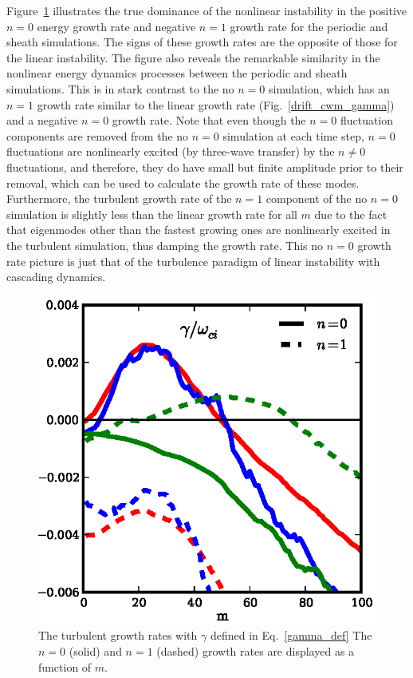 \documentclass[showpacs,preprintnumbers,amsmath,amssymb,superscriptaddress,aip]{revtex4-1}
\begin{document}
Figure~\ref{nl_vs_lin_gamma} illustrates the true dominance of the nonlinear instability in the positive $n=0$ energy growth rate and negative $n=1$ growth rate for the periodic and sheath simulations. 
The signs of these growth rates are the opposite of those for the linear instability.
The figure also reveals the remarkable similarity in the nonlinear energy dynamics processes between the periodic and sheath simulations. 
This is in stark contrast to the no $n=0$ simulation, which has an $n=1$
growth rate similar to the linear growth rate (Fig.~\ref{drift_cwm_gamma}) and a negative $n=0$ growth rate. Note that even though the $n=0$ fluctuation components are 
removed from the no $n=0$ simulation at each time
step, $n=0$ fluctuations are nonlinearly excited (by three-wave transfer) by the $n \ne 0$ fluctuations, 
and therefore, they do have small but finite amplitude prior to their removal, which can be used to
calculate the growth rate of these modes. Furthermore, the turbulent growth rate of the $n=1$ component of the no $n=0$ simulation is
slightly less than the linear growth rate for all $m$ due to the fact that eigenmodes other than the fastest growing ones are nonlinearly excited in the turbulent simulation, 
thus damping the growth rate.
This no $n=0$ growth rate picture is just that of the turbulence paradigm of linear instability with cascading dynamics. 


\begin{figure}[!htbp]
\includegraphics[]{lin_vs_nl_gamma}
\hfil
\caption{ The turbulent growth rates with $\gamma$ defined in Eq.~\ref{gamma_def} The $n=0$ (solid) and $n = 1$ (dashed) 
growth rates are displayed as a function of $m$.}
\label{nl_vs_lin_gamma}
\end{figure}
\end{document}
